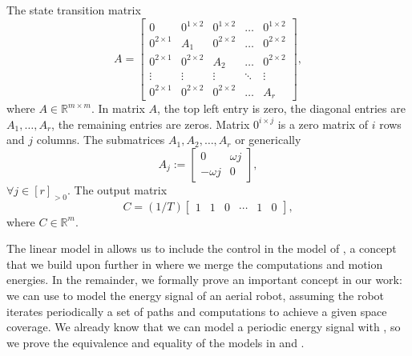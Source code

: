 The state transition matrix
\begin{equation}\label{eq:mat_A}
  A=\left[\begin{array}{ccccc}
    0            & 0^{1\times 2}& 0^{1\times 2}& \dots& 0^{1\times 2} \\
    0^{2\times 1}& A_1          & 0^{2\times 2}& \dots& 0^{2\times 2} \\
    0^{2\times 1}& 0^{2\times 2}& A_2          & \dots& 0^{2\times 2} \\
    \vdots       & \vdots       & \vdots       &\ddots& \vdots        \\
    0^{2\times 1}& 0^{2\times 2}& 0^{2\times 2}& \dots& A_r 
  \end{array}\right],
\end{equation}
where $A\in\mathbb{R}^{m\times m}$. In matrix $A$, the top left entry is zero, the diagonal entries are $A_1,\dots,A_r$, the remaining entries are zeros. Matrix $0^{i\times j}$ is a zero matrix of $i$ rows and $j$ columns. The submatrices $A_1,A_2,\dots,A_r$ or generically
\begin{equation}\label{eq:aj}
  A_j:=\begin{bmatrix}0 & \omega j \\ -\omega j & 0\end{bmatrix},
\end{equation}
$\forall j\in[r]_{>0}$. The output matrix
\begin{equation}\label{eq:mat_C}
  C=(1/T)\left[\begin{array}{cccccc}
    1 & 1 & 0 &\cdots & 1 & 0
  \end{array}\right],
\end{equation}
where $C\in\mathbb{R}^m$.

The linear model in  allows us to include the control in the model of , a concept that we build upon further in  where we merge the computations and motion energies. 
In the remainder, we formally prove an important concept in our work: we can use  to model the energy signal of an aerial robot, assuming the robot iterates periodically a set of paths and computations to achieve a given space coverage. 
We already know that we can model a periodic energy signal with , so we prove the equivalence and equality of the models in  and .

